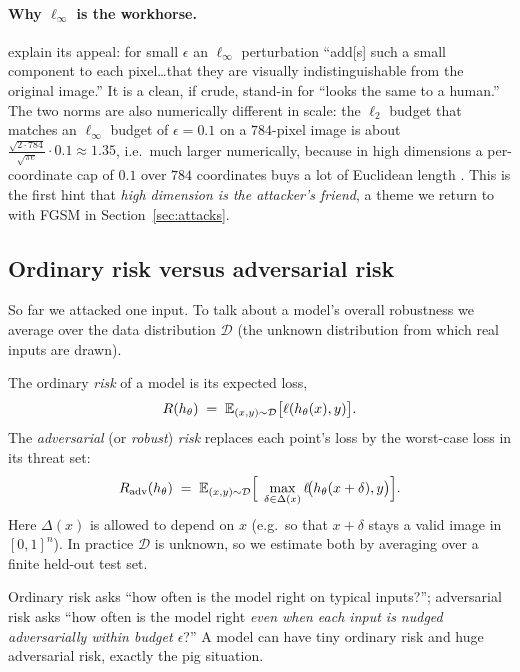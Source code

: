 \paragraph{Why $\ell_\infty$ is the workhorse.} \citet{kolter2018adversarial} explain its appeal: for small $\epsilon$ an $\ell_\infty$ perturbation ``add[s] such a small component to each pixel\dots that they are visually indistinguishable from the original image.'' It is a clean, if crude, stand-in for ``looks the same to a human.'' The two norms are also numerically different in scale: the $\ell_2$ budget that matches an $\ell_\infty$ budget of $\epsilon=0.1$ on a $784$-pixel image is about $\tfrac{\sqrt{2\cdot784}}{\sqrt{\pi e}}\cdot 0.1 \approx 1.35$, i.e.\ much larger numerically, because in high dimensions a per-coordinate cap of $0.1$ over $784$ coordinates buys a lot of Euclidean length \citep{kolter2018adversarial}. This is the first hint that \emph{high dimension is the attacker's friend}, a theme we return to with FGSM in Section~\ref{sec:attacks}.

\subsection{Ordinary risk versus adversarial risk}
\label{sub:risk}

So far we attacked one input. To talk about a model's overall robustness we average over the data distribution $\mathcal D$ (the unknown distribution from which real inputs are drawn).

\begin{definition}
The ordinary \emph{risk} of a model is its expected loss,
\[
  R(h_\theta) \;=\; \mathbb{E}_{(x,y)\sim\mathcal D}\big[\ell(h_\theta(x),y)\big].
\]
The \emph{adversarial} (or \emph{robust}) \emph{risk} replaces each point's loss by the worst-case loss in its threat set:
\[
  R_{\mathrm{adv}}(h_\theta) \;=\; \mathbb{E}_{(x,y)\sim\mathcal D}\Big[\;\max_{\delta\in\Delta(x)} \ell\!\big(h_\theta(x+\delta),y\big)\Big].
\]
Here $\Delta(x)$ is allowed to depend on $x$ (e.g.\ so that $x+\delta$ stays a valid image in $[0,1]^n$). In practice $\mathcal D$ is unknown, so we estimate both by averaging over a finite held-out test set.
\end{definition}

Ordinary risk asks ``how often is the model right on typical inputs?''; adversarial risk asks ``how often is the model right \emph{even when each input is nudged adversarially within budget $\epsilon$}?'' A model can have tiny ordinary risk and huge adversarial risk, exactly the pig situation.


